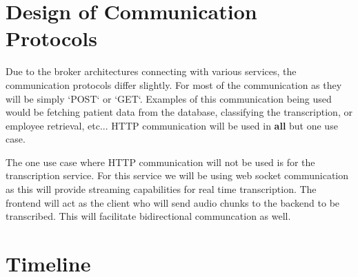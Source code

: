 \documentclass[12pt, titlepage]{article}
\begin{document}

\section{Design of Communication Protocols}

Due to the broker architectures connecting with various services, the communication protocols differ slightly. For most of the communication as they will be simply `POST` or `GET`. Examples of this communication being used would be fetching patient data from the database, classifying the transcription, or employee retrieval, etc... HTTP communication will be used in \textbf{all} but one use case.

The one use case where HTTP communication will not be used is for the transcription service. For this service we will be using web socket communication as this will provide streaming capabilities for real time transcription. The frontend will act as the client who will send audio chunks to the backend to be transcribed. This will facilitate bidirectional communcation as well.


\section{Timeline}
\end{document}

